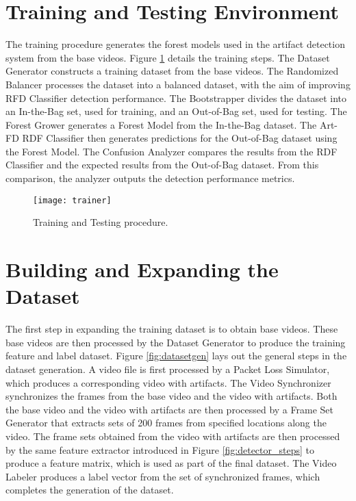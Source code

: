 \section{Training and Testing Environment}
\label{sec:sol_train_procedure}

The training procedure generates the forest models used in the artifact detection system from the base videos. Figure \ref{fig:trainer} details the training steps. The Dataset Generator constructs a training dataset from the base videos. The Randomized Balancer processes the dataset into a balanced dataset, with the aim of improving RFD Classifier detection performance. The Bootstrapper divides the dataset into an In-the-Bag set, used for training, and an Out-of-Bag set, used for testing. The Forest Grower generates a Forest Model from the In-the-Bag dataset. The Art-FD RDF Classifier then generates predictions for the Out-of-Bag dataset using the Forest Model. The Confusion Analyzer compares the results from the RDF Classifier and the expected results from the Out-of-Bag dataset. From this comparison, the analyzer outputs the detection performance metrics.

\begin{figure} [!h]
  \centering
  
  \texttt{[image: trainer]}
  
  \caption{Training and Testing procedure.}
  \label{fig:trainer}

\end{figure}

\section{Building and Expanding the Dataset}
\label{sec:sol_dataset}

The first step in expanding the training dataset is to obtain base videos. These base videos are then processed by the Dataset Generator to produce the training feature and label dataset. Figure \ref{fig:datasetgen} lays out the general steps in the dataset generation. A video file is first processed by a Packet Loss Simulator, which produces a corresponding video with artifacts. The Video Synchronizer synchronizes the frames from the base video and the video with artifacts. Both the base video and the video with artifacts are then processed by a Frame Set Generator that extracts sets of 200 frames from specified locations along the video. The frame sets obtained from the video with artifacts are then processed by the same feature extractor introduced in Figure \ref{fig:detector_steps} to produce a feature matrix, which is used as part of the final dataset. The Video Labeler produces a label vector from the set of synchronized frames, which completes the generation of the dataset.

